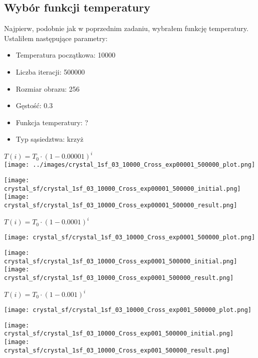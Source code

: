 \subsection{Wybór funkcji temperatury}
Najpierw, podobnie jak w poprzednim zadaniu, wybrałem funkcję temperatury.
Ustaliłem następujące parametry:
\begin{itemize}
\item Temperatura początkowa: 10000
\item Liczba iteracji: 500000
\item Rozmiar obrazu: 256
\item Gęstość: 0.3
\item Funkcja temperatury: ?
\item Typ sąsiedztwa: krzyż 
\end{itemize}

\begin{minipage}{\textwidth}
\begin{minipage}{.7\linewidth}
$T(i) = T_0\cdot(1-0.00001)^{i}$\\
  \texttt{[image: ../images/crystal\_1sf\_03\_10000\_Cross\_exp00001\_500000\_plot.png]}
\end{minipage}%
\begin{minipage}{.3\linewidth}
  \texttt{[image: crystal\_sf/crystal\_1sf\_03\_10000\_Cross\_exp00001\_500000\_initial.png]}
  \texttt{[image: crystal\_sf/crystal\_1sf\_03\_10000\_Cross\_exp00001\_500000\_result.png]}
\end{minipage}
\end{minipage}

\begin{minipage}{\textwidth}
$T(i) = T_0\cdot(1-0.0001)^{i}$\\
\begin{minipage}{.7\linewidth}
  \texttt{[image: crystal\_sf/crystal\_1sf\_03\_10000\_Cross\_exp0001\_500000\_plot.png]}
\end{minipage}%
\begin{minipage}{.3\linewidth}
  \texttt{[image: crystal\_sf/crystal\_1sf\_03\_10000\_Cross\_exp0001\_500000\_initial.png]}
  \texttt{[image: crystal\_sf/crystal\_1sf\_03\_10000\_Cross\_exp0001\_500000\_result.png]}
\end{minipage}
\end{minipage}

\begin{minipage}{\textwidth}
$T(i) = T_0\cdot(1-0.001)^{i}$\\
\begin{minipage}{.7\linewidth}
  \texttt{[image: crystal\_sf/crystal\_1sf\_03\_10000\_Cross\_exp001\_500000\_plot.png]}
\end{minipage}%
\begin{minipage}{.3\linewidth}
  \texttt{[image: crystal\_sf/crystal\_1sf\_03\_10000\_Cross\_exp001\_500000\_initial.png]}
  \texttt{[image: crystal\_sf/crystal\_1sf\_03\_10000\_Cross\_exp001\_500000\_result.png]}
\end{minipage}
\end{minipage}

